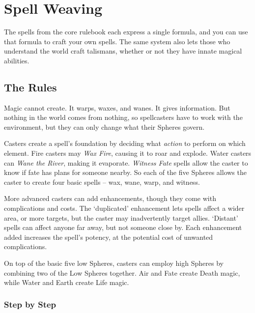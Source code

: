 \chapter{Spell Weaving}

The spells from the core rulebook each express a single formula, and you can use that formula to craft your own spells.
The same system also lets those who understand the world craft \glspl{talisman}, whether or not they have innate magical abilities.

\section{The Rules}

\begin{multicols}{2}

\noindent
Magic cannot create.
It warps, waxes, and wanes.
It gives information.
But nothing in the world comes from nothing, so spellcasters have to work with the environment, but they can only change what their Spheres govern.

Casters create a spell's foundation by deciding what \emph{action} to perform on which element.
Fire casters may \textit{Wax Fire}, causing it to roar and explode.
Water casters can \textit{Wane the River}, making it evaporate.
\textit{Witness Fate} spells allow the caster to know if fate has plans for someone nearby.
So each of the five Spheres allows the caster to create four basic spells -- wax, wane, warp, and witness.

More advanced casters can add enhancements, though they come with complications and costs.
The `duplicated' enhancement lets spells affect a wider area, or more targets, but the caster may inadvertently target allies.
`Distant' spells can affect anyone far away, but not someone close by.
Each enhancement added increases the spell's potency, at the potential cost of unwanted complications.

On top of the basic five low Spheres, casters can employ high Spheres by combining two of the Low Spheres together.
Air and Fate create Death magic, while Water and Earth create Life magic.

\subsection{Step by Step}


\end{multicols}
